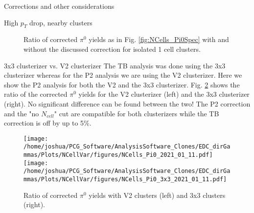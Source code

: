 \documentclass[ALICE]{ALICE_analysis_notes}
\begin{document}
\begin{section}{Corrections and other considerations}
\begin{subsection}{High $p_{T}$ drop, nearby clusters}
\begin{figure}[ht!]
	\caption{ Ratio of corrected $\pi^{0}$ yields as in Fig. \ref{fig:NCells_Pi0Spec} with and without the discussed correction for isolated 1 cell clusters.  }
	\label{fig:ShowerOverlaps_Result}
\end{figure}
\end{subsection}
\newpage

\begin{subsection}{3x3 clusterizer vs. V2 clusterizer}
The TB analysis was done using the 3x3 clusterizer whereas for the P2 analysis we are using the V2 clusterizer. Here we show the P2 analysis for both the V2 and the 3x3 clusterizer. Fig. \ref{fig:3x3VsV2} shows the ratio of the corrected $\pi^{0}$ yields for the V2 clusterizer (left) and the 3x3 clusterizer (right). No significant difference can be found between the two! The P2 correction and the "no $N_{cell}$" cut are compatible for both clusterizers while the TB correction is off by up to 5\%.

\begin{figure}[ht!]
	\centering
	\texttt{[image: /home/joshua/PCG\_Software/AnalysisSoftware\_Clones/EDC\_dirGammas/Plots/NCellVar/figures/NCells\_Pi0\_2021\_01\_11.pdf]}	
	\texttt{[image: /home/joshua/PCG\_Software/AnalysisSoftware\_Clones/EDC\_dirGammas/Plots/NCellVar/figures/NCells\_Pi0\_3x3\_2021\_01\_11.pdf]}
	
	
	
	\caption{ Ratio of corrected $\pi^{0}$ yields with V2 clusters (left) and 3x3 clusters (right).  }
	\label{fig:3x3VsV2}
\end{figure}
\end{subsection}


\end{section}
\end{document}
